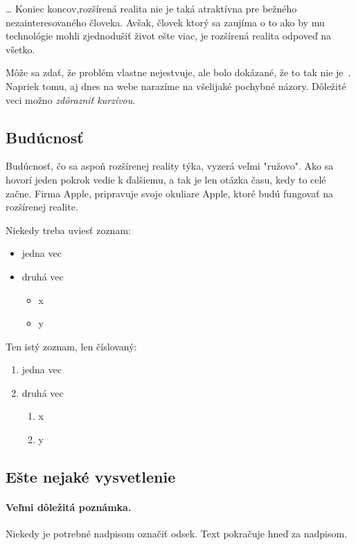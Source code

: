 \documentclass[10pt,twoside,slovak,a4paper]{article}
\begin{document}
\ldots{} Koniec koncov,rozšírená realita nie je taká atraktívna pre bežného nezainteresovaného človeka. Avšak, človek ktorý sa zaujíma o to ako by mu technológie mohli zjednodušiť život ešte viac, je rozšírená realita odpoveď na všetko.

Môže sa zdať, že problém vlastne nejestvuje\cite{Coplien:MPD}, ale bolo dokázané, že to tak nie je~\cite{Czarnecki:Staged, Czarnecki:Progress}. Napriek tomu, aj dnes na webe narazíme na všelijaké pochybné názory\cite{PLP-Framework}. Dôležité veci možno \emph{zdôrazniť kurzívou}.


\subsection{Budúcnosť} \label{4:3}

Budúcnosť, čo sa aspoň rozšírenej reality týka, vyzerá veľmi "ružovo". Ako sa hovorí jeden pokrok vedie k ďalšiemu, a tak je len otázka času, kedy to celé začne. Firma Apple, pripravuje svoje okuliare Apple, ktoré budú fungovať na rozšírenej realite.



Niekedy treba uviesť zoznam:

\begin{itemize}
\item jedna vec
\item druhá vec
	\begin{itemize}
	\item x
	\item y
	\end{itemize}
\end{itemize}

Ten istý zoznam, len číslovaný:

\begin{enumerate}
\item jedna vec
\item druhá vec
	\begin{enumerate}
	\item x
	\item y
	\end{enumerate}
\end{enumerate}


\subsection{Ešte nejaké vysvetlenie} \label{ina:este}

\paragraph{Veľmi dôležitá poznámka.}
Niekedy je potrebné nadpisom označiť odsek. Text pokračuje hneď za nadpisom.
\end{document}
